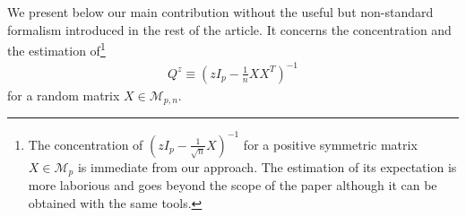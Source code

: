 \documentclass{ws-rmta}
\begin{document}
We present below our main contribution without the useful but non-standard formalism introduced in the rest of the article. It concerns the concentration and the estimation of\footnote{The concentration of $ (zI_p - \frac{1}{\sqrt n}X)^{-1}$ for a positive symmetric matrix $X \in \mathcal{M}_{p}$ is immediate from our approach. The estimation of its expectation is more laborious and goes beyond the scope of the paper although it can be obtained with the same tools.}
\begin{align*}
   Q^z \equiv \left( zI_p - \frac{1}{n}XX^T \right)^{-1}
 \end{align*} for a random matrix $X \in \mathcal{M}_{p,n}$.
\end{document}
